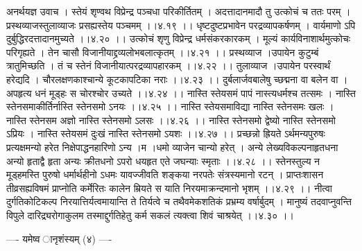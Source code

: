 \documentclass[11pt]{book}
\begin{document}
\begin{landscape}
अनर्थयज्ञ उवाच ।
स्तेयं शृण्वथ विप्रेन्द्र पञ्चधा परिकीर्तितम् ।
अदत्तादानमादौ तु उत्कोचं च ततः परम् ।
प्रस्थव्याजस्तुलाव्याजः प्रसह्यस्तेय पञ्चमम् ।।४.१९ ।।
धृष्टदुष्टप्रभावेन परद्रव्यापकर्षणम् ।
वार्यमाणो ऽपि दुर्बुद्धिरदत्तादानमुच्यते ।।४.२० ।।
उत्कोचं शृणु विप्रेन्द्र धर्मसंकरकारकम् ।
मूल्यं कार्यविनाशार्थमुत्कोचः परिगृह्यते ।
तेन चासौ विजानीयाद्द्रव्यलोभबलात्कृतम् ।।४.२१ ।।
प्रस्थव्याज ।उपायेन कुटुम्बं त्रातुमिच्छति ।
तं च स्तेनं विजानीयात्परद्रव्यापहारकम् ।।४.२२ ।।
तुलाव्याज ।उपायेन परस्वार्थं हरेद्यदि ।
चौरलक्षणकाश्चान्ये कूटकापटिका नराः ।।४.२३ ।।
दुर्बलार्जवबालेषु च्छद्मना वा बलेन वा ।
अपहृत्य धनं मूड्हः स चोरश्चोर उच्यते ।।४.२४ ।।
नास्ति स्तेयसमं पापं नास्त्यधर्मश्च तत्समः ।
नास्ति स्तेनसमाकीर्तिर्नास्ति स्तेनसमो ऽनयः ।।४.२५ ।।
नास्ति स्तेयसमाविद्या नास्ति स्तेनसमः खलः ।
नास्ति स्तेनसम अज्ञो नास्ति स्तेनसमो ऽलसः ।।४.२६ ।।
नास्ति स्तेनसमो द्वेष्यो नास्ति स्तेनसमो ऽप्रियः ।
नास्ति स्तेयसमं दुःखं नास्ति स्तेनसमो ऽयशः ।।४.२७ ।।
प्रच्छन्नो ह्रियते ऽर्थमन्यपुरुषः प्रत्यक्षमन्यो हरेत
निक्षेपाद्धनहारिणो ऽन्य{ ।}म{ ।}धमो व्याजेन चान्यो हरेत् ।
अन्ये लेख्यविकल्पनाहृतधना अन्यो हृताद्वै हृता
अन्यः क्रीतधनो ऽपरो धयहृत एते जघन्याः स्मृताः ।।४.२८ ।।
स्तेनस्तुल्य न मूड्हमस्ति पुरुषो धर्मार्थहीनो ऽधमः
यावज्जीवति शङ्कया नरपतेः संत्रस्यमानो रटन् ।
प्राप्तःशासन तीव्रसह्यविषमं प्राप्नोति कर्मेरितः
कालेन म्रियते स याति निरयमाक्रन्दमानो भृशम् ।।४.२९ ।।
नीत्वा दुर्गतिकोटिकल्प निरयात्तिर्यत्वमायान्ति ते
तिर्यत्वे च तथैवमेकशतिकं प्रभ्रम्य वर्षार्बुदम् ।
मानुष्यं तदवाप्नुवन्ति विपुले दारिद्र्यरोगाकुलम
तस्माद्दुर्गतिहेतु कर्म सकलं त्यक्त्वा शिवं चाश्रयेत् ।।४.३० ।।

---- यमेष्व{ }ानृशंस्यम् (४) ----


\end{landscape}
\end{document}
